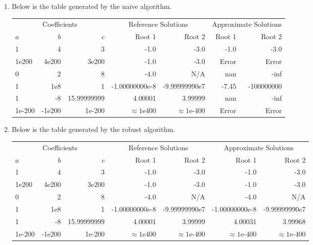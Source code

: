\documentclass{article}
\theoremstyle{definition}
\theoremstyle{remark}
\begin{document}
\begin{enumerate}
\begin{enumerate}
        \item Below is the table generated by the naive algorithm.
        \begin{center}
            \begin{tabular}{lrr rrrr}
            \toprule
            \multicolumn{3}{c}{Coefficients} & \multicolumn{2}{c}{Reference Solutions} & \multicolumn{2}{c}{Approximate Solutions} \\
            \cmidrule(r){1-3} \cmidrule(lr){4-5} \cmidrule(l){6-7}
            $a$ & $b$ & $c$ & Root 1 & Root 2 & Root 1 & Root 2 \\
            \midrule
            1 & 4 & 3 & -1.0 & -3.0 & -1.0 & -3.0 \\
            1e200 & 4e200 & 3e200 & -1.0 & -3.0 & Error & Error \\
            0 & 2 & 8 & -4.0 & N/A & nan & -inf \\
            1 & 1e8 & 1 & -1.00000000e-8 & -9.99999990e7 & -7.45 & -100000000 \\
            1 & -8 & 15.99999999 & 4.00001 & 3.99999 & nan & -inf \\
            1e-200 & -1e200 & 1e-200 & $\approx 1$e400 & $\approx 1$e-400 & Error & Error \\
            \bottomrule
            \end{tabular}
        \end{center}

        \item Below is the table generated by the robust algorithm.
        \begin{center}
            \begin{tabular}{lrr rrrr}
            \toprule
            \multicolumn{3}{c}{Coefficients} & \multicolumn{2}{c}{Reference Solutions} & \multicolumn{2}{c}{Approximate Solutions} \\
            \cmidrule(r){1-3} \cmidrule(lr){4-5} \cmidrule(l){6-7}
            $a$ & $b$ & $c$ & Root 1 & Root 2 & Root 1 & Root 2 \\
            \midrule
            1 & 4 & 3 & -1.0 & -3.0 & -1.0 & -3.0 \\
            1e200 & 4e200 & 3e200 & -1.0 & -3.0 & -1.0 & -3.0 \\
            0 & 2 & 8 & -4.0 & N/A & -4.0 & N/A \\
            1 & 1e8 & 1 & -1.00000000e-8 & -9.99999990e7 & -1.00000000e-8 & -9.99999990e7 \\
            1 & -8 & 15.99999999 & 4.00001 & 3.99999 & 4.00031 & 3.99968 \\
            1e-200 & -1e200 & 1e-200 & $\approx 1$e400 & $\approx 1$e-400 & $\approx 1$e-400 & $\approx 1$e-400 \\
            \bottomrule
            \end{tabular}
        \end{center}


\end{enumerate}
\end{enumerate}
\end{document}
